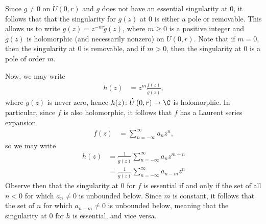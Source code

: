 \documentclass[11pt]{mypackage}
\begin{document}
\begin{solution}
  Since $g\neq 0$ on $\dot{U}\left( 0,r \right)$ and $g$ does not have an essential singularity at $0$, it follows that that the singularity for $g(z)$ at $0$ is either a pole or removable. This allows us to write $g(z) = z^{-m} \widetilde{g}(z)$, where $m \geq 0$ is a positive integer and $\widetilde{g}(z)$ is holomorphic (and necessarily nonzero) on $U\left( 0,r \right)$. Note that if $m = 0$, then the singularity at $0$ is removable, and if $m > 0$, then the singularity at $0$ is a pole of order $m$.\newline

  Now, we may write
  \begin{align*}
    h(z) &= z^{m}\frac{f(z)}{\widetilde{g}(z)},
  \end{align*}
  where $ \widetilde{g}(z) $ is never zero, hence $h(z)\colon \dot{U}\left( 0,r \right)\rightarrow \C$ is holomorphic. In particular, since $f$ is also holomorphic, it follows that $f$ has a Laurent series expansion
  \begin{align*}
    f(z) &= \sum_{n=-\infty}^{\infty} a_n z^{n},
  \end{align*}
  so we may write
  \begin{align*}
    h(z) &= \frac{1}{\widetilde{g}(z)} \sum_{n=-\infty}^{\infty} a_nz^{m+n}\\
         &= \frac{1}{\widetilde{g}(z)} \sum_{n=-\infty}^{\infty} a_{n-m}z^{n}
  \end{align*}
  Observe then that the singularity at $0$ for $f$ is essential if and only if the set of all $n < 0$ for which $a_{n}\neq 0$ is unbounded below. Since $m$ is constant, it follows that the set of $n$ for which $a_{n-m}\neq 0$ is unbounded below, meaning that the singularity at $0$ for $h$ is essential, and vice versa.
\end{solution}
\end{document}
